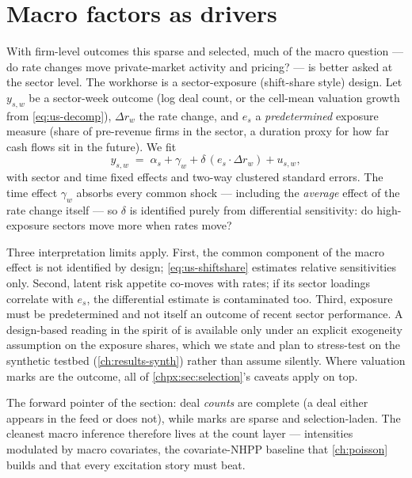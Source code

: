 \section{Macro factors as drivers}\label{chpx:sec:macro}

With firm-level outcomes this sparse and selected, much of the macro question --- do rate
changes move private-market activity and pricing? --- is better asked at the sector level. The
workhorse is a sector-exposure (shift-share style) design. Let $y_{s,w}$ be a sector-week
outcome (log deal count, or the cell-mean valuation growth from \cref{eq:us-decomp}), $\Delta
r_w$ the rate change, and $e_s$ a \emph{predetermined} exposure measure (share of pre-revenue
firms in the sector, a duration proxy for how far cash flows sit in the future). We fit
\begin{equation}\label{eq:us-shiftshare}
y_{s,w} \;=\; \alpha_s + \gamma_w + \delta\,(e_s \cdot \Delta r_w) +
u_{s,w},
\end{equation}
with sector and time fixed effects and two-way clustered standard errors. The time effect
$\gamma_w$ absorbs every common shock --- including the \emph{average} effect of the rate change
itself --- so $\delta$ is identified purely from differential sensitivity: do high-exposure
sectors move more when rates move?

Three interpretation limits apply. First, the common component of the macro effect is not
identified by design; \cref{eq:us-shiftshare} estimates relative sensitivities only. Second,
latent risk appetite co-moves with rates; if its sector loadings correlate with $e_s$, the
differential estimate is contaminated too. Third, exposure must be predetermined and not itself
an outcome of recent sector performance. A design-based reading in the spirit of
\citet{imbens2015} is available only under an explicit exogeneity assumption on the exposure
shares, which we state and plan to stress-test on the synthetic testbed
(\cref{ch:results-synth}) rather than assume silently. Where valuation marks are the outcome,
all of \cref{chpx:sec:selection}'s caveats apply on top.

The forward pointer of the section: deal \emph{counts} are complete (a deal either appears in
the feed or does not), while marks are sparse and selection-laden. The cleanest macro inference
therefore lives at the count layer --- intensities modulated by macro covariates, the
covariate-NHPP baseline that \cref{ch:poisson} builds and that every excitation story must
beat.

